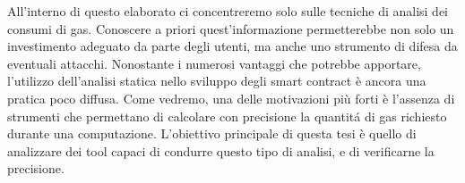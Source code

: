 \indent All'interno di questo elaborato ci concentreremo solo sulle tecniche di analisi dei consumi di gas. Conoscere a priori quest'informazione permetterebbe non solo un investimento adeguato da parte degli utenti, ma anche uno strumento di difesa da eventuali attacchi. Nonostante i numerosi vantaggi che potrebbe apportare, l'utilizzo dell'analisi statica nello sviluppo degli smart contract è ancora una pratica poco diffusa. Come vedremo, una delle motivazioni più forti è l'assenza di strumenti che permettano di calcolare con precisione la quantitá di gas richiesto durante una computazione. L'obiettivo principale di questa tesi è quello di analizzare dei tool capaci di condurre questo tipo di analisi, e di verificarne la precisione.\newline
